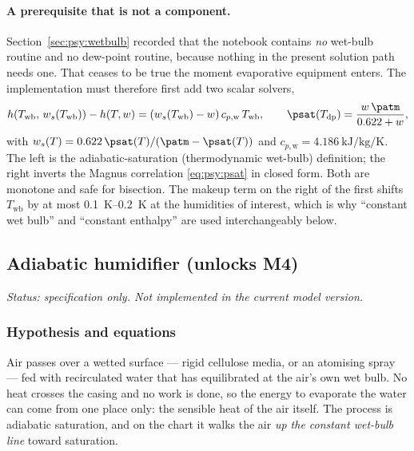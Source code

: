\paragraph{A prerequisite that is not a component.}
Section~\ref{sec:psy:wetbulb} recorded that the notebook contains \emph{no} wet-bulb routine and no
dew-point routine, because nothing in the present solution path needs one. That ceases to be true
the moment evaporative equipment enters. The implementation must therefore first add two scalar
solvers,
\begin{equation}
h\!\left(T_{\mathrm{wb}},\, w_{s}(T_{\mathrm{wb}})\right) - h(T,w)
 = \left(w_{s}(T_{\mathrm{wb}}) - w\right) c_{p,\mathrm{w}}\,T_{\mathrm{wb}} ,
\qquad
\psat(T_{\mathrm{dp}}) = \frac{w\,\patm}{0.622 + w} ,
\label{eq:spec:wbdp}
\end{equation}
with $w_{s}(T) = 0.622\,\psat(T)/(\patm-\psat(T))$ and
$c_{p,\mathrm{w}}=\SI{4.186}{\kilo\joule\per\kilogram\per\kelvin}$. The left is the
adiabatic-saturation (thermodynamic wet-bulb) definition; the right inverts the Magnus correlation
\eqref{eq:psy:psat} in closed form. Both are monotone and safe for bisection. The makeup term on the
right of the first shifts $T_{\mathrm{wb}}$ by at most \SIrange{0.1}{0.2}{\kelvin} at the humidities
of interest, which is why ``constant wet bulb'' and ``constant enthalpy'' are used interchangeably
below.

\subsection{Adiabatic humidifier (unlocks M4)}
\label{sec:spec:hum}

\emph{Status: specification only. Not implemented in the current model version.}

\subsubsection{Hypothesis and equations}
Air passes over a wetted surface --- rigid cellulose media, or an atomising spray --- fed with
recirculated water that has equilibrated at the air's own wet bulb. No heat crosses the casing and no
work is done, so the energy to evaporate the water can come from one place only: the sensible heat of
the air itself. The process is adiabatic saturation, and on the chart it walks the air \emph{up the
constant wet-bulb line} toward saturation.

